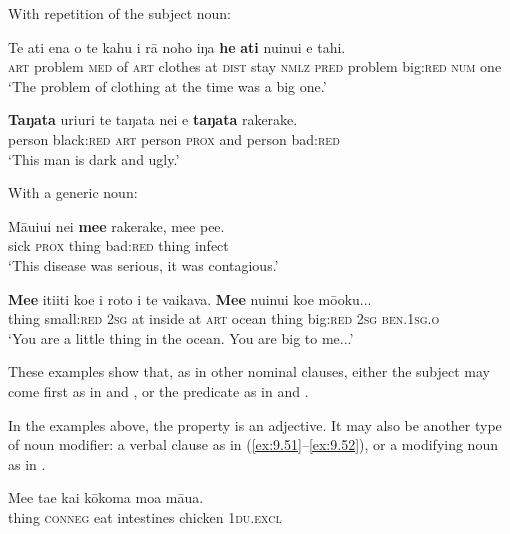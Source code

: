 With repetition of the subject noun:

\ea\label{ex:9.47}
\gll Te {\ꞌ}ati ena o te kahu {\ꞌ}i rā noho iŋa \textbf{he} \textbf{{\ꞌ}ati} nuinui e tahi. \\
\textsc{art} problem \textsc{med} of \textsc{art} clothes at \textsc{dist} stay \textsc{nmlz} \textsc{pred} problem big:\textsc{red} \textsc{num} one \\

\glt 
‘The problem of clothing at the time was a big one.’ \textstyleExampleref{[R380.093]} 
\z

\ea\label{ex:9.48}
\gll \textbf{Taŋata} {\ꞌ}uri{\ꞌ}uri te taŋata nei {\ꞌ}e \textbf{taŋata} rakerake. \\
person black:\textsc{red} \textsc{art} person \textsc{prox}\textsc{} and person bad:\textsc{red} \\

\glt
‘This man is dark and ugly.’ \textstyleExampleref{[R372.133]} 
\z

With a generic noun:

\ea\label{ex:9.49}
\gll Māuiui nei \textbf{me{\ꞌ}e} rakerake, me{\ꞌ}e pe{\ꞌ}e. \\
sick \textsc{prox} thing bad:\textsc{red} thing infect \\

\glt 
‘This disease was serious, it was contagious.’ \textstyleExampleref{[R231.318]} 
\z

\ea\label{ex:9.50}
\gll \textbf{Me{\ꞌ}e} {\ꞌ}iti{\ꞌ}iti koe {\ꞌ}i roto i te vaikava. \textbf{Me{\ꞌ}e} nuinui koe mō{\ꞌ}oku... \\
thing small:\textsc{red} \textsc{2sg} at inside at \textsc{art} ocean thing big:\textsc{red} \textsc{2sg} \textsc{ben.1sg.o} \\

\glt
‘You are a little thing in the ocean. You are big to me...’ \textstyleExampleref{[R474.007]} 
\z

These examples show that, as in other nominal clauses, either the subject may come first as in  and , or the predicate as in  and .

In the examples above, the property is an adjective. It may also be another type of noun modifier: a verbal clause as in (\ref{ex:9.51}–\ref{ex:9.52}), or a modifying noun as in .

\ea\label{ex:9.51}
\gll Me{\ꞌ}e ta{\ꞌ}e kai kōkoma moa māua. \\
thing \textsc{conneg} eat intestines chicken \textsc{1du.excl} \\


